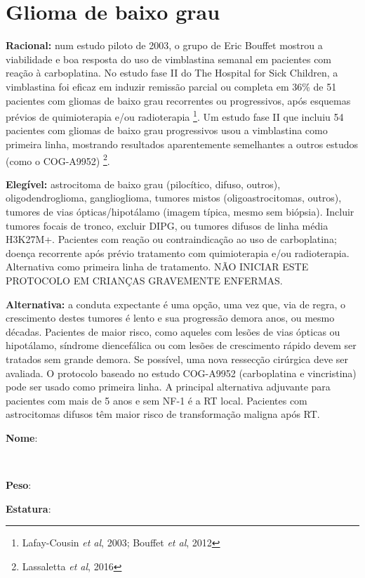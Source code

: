 \documentclass[11pt,a4paper,oldfontcommands]{memoir}
\def\entrywithlabel[#1]#2{\parbox{#1}{{\small #2:} \hrulefill}}
\begin{document}
\section{Glioma de baixo grau}
{\let\thefootnote\relax{}}
\textbf{Racional:} num estudo piloto de 2003, o grupo de Eric Bouffet mostrou a viabilidade e boa resposta do uso de vimblastina semanal em pacientes com reação à carboplatina. No estudo fase II do The Hospital for Sick Children, a vimblastina foi eficaz em induzir remissão parcial ou completa em 36\% de 51 pacientes com gliomas de baixo grau recorrentes ou progressivos, após esquemas prévios de quimioterapia e/ou radioterapia \footnote{Lafay-Cousin \textit{et al}, 2003; Bouffet \textit{et al}, 2012}. Um estudo fase II que incluiu 54 pacientes com gliomas de baixo grau progressivos usou a vimblastina como primeira linha, mostrando resultados aparentemente semelhantes a outros estudos (como o COG-A9952) \footnote{Lassaletta \textit{et al}, 2016}.

\textbf{Elegível:} astrocitoma de baixo grau (pilocítico, difuso, outros), oligodendroglioma, ganglioglioma, tumores mistos (oligoastrocitomas, outros), tumores de vias ópticas/hipotálamo (imagem típica, mesmo sem biópsia). Incluir tumores focais de tronco, excluir DIPG, ou tumores difusos de linha média H3K27M+. Pacientes com reação ou contraindicação ao uso de carboplatina; doença recorrente após prévio tratamento com quimioterapia e/ou radioterapia. Alternativa como primeira linha de tratamento. NÃO INICIAR ESTE PROTOCOLO EM CRIANÇAS GRAVEMENTE ENFERMAS.

\textbf{Alternativa:} a conduta expectante é uma opção, uma vez que, via de regra, o crescimento destes tumores é lento e sua progressão demora anos, ou mesmo décadas. Pacientes de maior risco, como aqueles com lesões de vias ópticas ou hipotálamo, síndrome diencefálica ou com lesões de crescimento rápido devem ser tratados sem grande demora. Se possível, uma nova ressecção cirúrgica deve ser avaliada. O protocolo baseado no estudo COG-A9952 (carboplatina e vincristina) pode ser usado como primeira linha. A principal alternativa adjuvante para pacientes com mais de 5 anos e sem NF-1 é a RT local. Pacientes com astrocitomas difusos têm maior risco de transformação maligna após RT.
\\[0.4cm]
\entrywithlabel[1\hsize]{\textbf{Nome}}\hfill
\\[0.3cm]
\entrywithlabel[.45\hsize]{\textbf{Peso}}\hfill  \entrywithlabel[.45\hsize]{\textbf{Estatura}}
\end{document}
